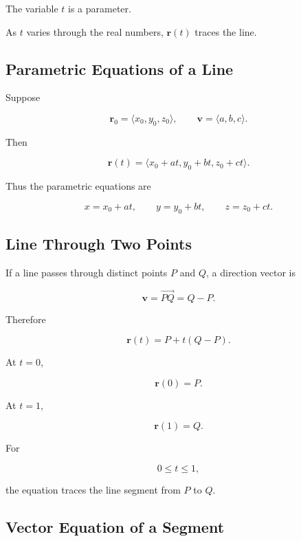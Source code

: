 The variable \(t\) is a parameter.

As \(t\) varies through the real numbers, \(\mathbf{r}(t)\) traces the line.

\subsection{Parametric Equations of a Line}
\label{subsec:parametric-line-equations}

Suppose

\[
\mathbf{r}_0=\langle x_0,y_0,z_0\rangle,\qquad
\mathbf{v}=\langle a,b,c\rangle.
\]

Then

\[
\mathbf{r}(t)
=
\langle x_0+at,y_0+bt,z_0+ct\rangle.
\]

Thus the parametric equations are

\[
\boxed{
x=x_0+at,\qquad
y=y_0+bt,\qquad
z=z_0+ct.
}
\]

\subsection{Line Through Two Points}
\label{subsec:vector-line-two-points}

If a line passes through distinct points \(P\) and \(Q\), a direction vector
is

\[ \mathbf{v}=\overrightarrow{PQ}=Q-P. \]

Therefore

\[ \boxed{\mathbf{r}(t)=P+t(Q-P).} \]

At \(t=0\),

\[ \mathbf{r}(0)=P. \]

At \(t=1\),

\[ \mathbf{r}(1)=Q. \]

For

\[ 0\leq t\leq1, \]

the equation traces the line segment from \(P\) to \(Q\).

\subsection{Vector Equation of a Segment}
\label{subsec:vector-line-segment}

